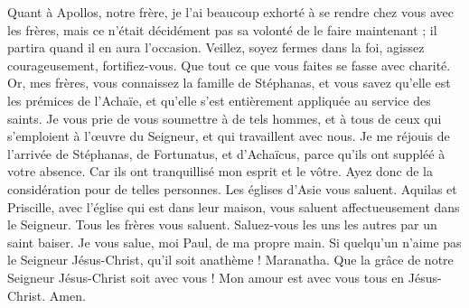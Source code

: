\begin{multicols}{2}
Quant à Apollos, notre frère, je l'ai beaucoup exhorté à se rendre chez vous avec les frères, mais ce n’était décidément pas sa volonté de le faire maintenant ; il partira quand il en aura l’occasion.
Veillez, soyez fermes dans la foi, agissez courageusement, fortifiez-vous.
Que tout ce que vous faites se fasse avec charité.
Or, mes frères, vous connaissez la famille de Stéphanas, et vous savez qu'elle est les prémices de l'Achaïe, et qu’elle s’est entièrement appliquée au service des saints.
Je vous prie de vous soumettre à de tels hommes, et à tous de ceux qui s’emploient à l’œuvre du Seigneur, et qui travaillent avec nous.
Je me réjouis de l’arrivée de Stéphanas, de Fortunatus, et d’Achaïcus, parce qu'ils ont suppléé à votre absence.
Car ils ont tranquillisé mon esprit et le vôtre. Ayez donc de la considération pour de telles personnes.
Les églises d'Asie vous saluent. Aquilas et Priscille, avec l'église qui est dans leur maison, vous saluent affectueusement dans le Seigneur.
Tous les frères vous saluent. Saluez-vous les uns les autres par un saint baiser.
Je vous salue, moi Paul, de ma propre main.
Si quelqu'un n'aime pas le Seigneur Jésus-Christ, qu'il soit anathème ! Maranatha.
Que la grâce de notre Seigneur Jésus-Christ soit avec vous !
Mon amour est avec vous tous en Jésus-Christ. Amen.
\PPE{}
\end{multicols}
